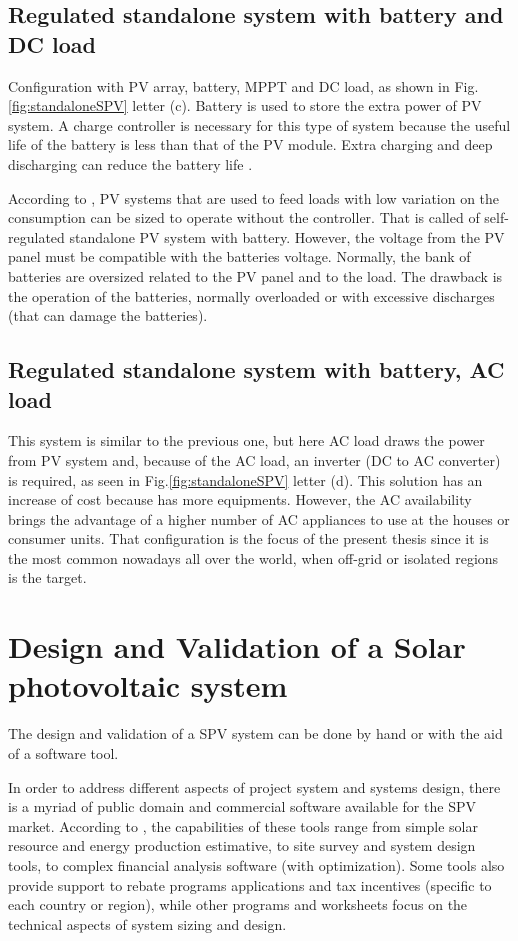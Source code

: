 \documentclass[journal]{IEEEtran}
\begin{document}
\subsection{Regulated standalone system with battery and DC load}
Configuration with PV array, battery, MPPT and DC load, as shown in Fig.\ref{fig:standaloneSPV} letter (c). Battery is used to store the extra power of PV system. A charge controller is necessary for this type of system because the useful life of the battery is less than that of the PV module. Extra charging and deep discharging can reduce the battery life \cite{Kim}. 

According to \cite{Pinho}, PV systems that are used to feed loads with low variation on the consumption can be sized to operate without the controller. That is called of self-regulated standalone PV system with battery. However, the voltage from the PV panel must be compatible with the batteries voltage. Normally, the bank of batteries are oversized related to the PV panel and to the load. The drawback is the operation of the batteries, normally overloaded or with excessive discharges (that can damage the batteries).

\subsection{Regulated standalone system with battery, AC load}
This system is similar to the previous one, but here AC load draws the power from PV system and, because of the AC load, an inverter (DC to AC converter) is required, as seen in Fig.\ref{fig:standaloneSPV} letter (d). This solution has an increase of cost because has more equipments. However, the AC availability brings the advantage of a higher number of AC appliances to use at the houses or consumer units. That configuration is the focus of the present thesis since it is the most common nowadays all over the world, when off-grid or isolated regions is the target.

\section{Design and Validation of a Solar photovoltaic system}
The design and validation of a SPV system can be done by hand or with the aid of a software tool. 

In order to address different aspects of project system and systems design, there is a myriad of public domain and commercial software available for the SPV market. According to \cite{Brooks}, the capabilities of these tools range from simple solar resource and energy production estimative, to site survey and system design tools, to complex financial analysis software (with optimization). Some tools also provide support to rebate programs applications and tax incentives (specific to each country or region), while other programs and worksheets focus on the technical aspects of system sizing and design.
 
\end{document}
